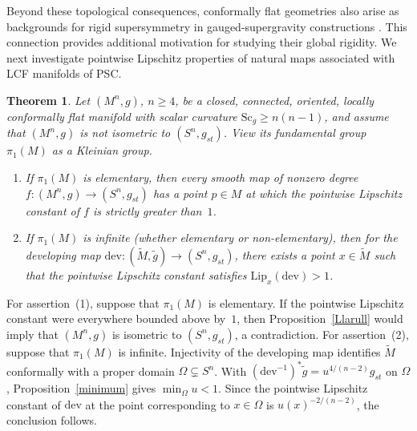 \documentclass[12pt,oneside,a4paper]{article}
\newtheorem{theoremC}{Theorem}
\theoremstyle{mytheorem}
\theoremstyle{remark}
\theoremstyle{definition}
\begin{document}
Beyond these topological consequences, conformally flat geometries also arise
as backgrounds for rigid supersymmetry in gauged-supergravity constructions
\cite{zbMATH06267307}. This connection
provides additional motivation for studying their global rigidity. We next
investigate pointwise Lipschitz properties of natural maps associated with LCF
manifolds of PSC.

\begin{theoremC}\label{Lipschitz}
Let $(M^{n}, g)$, $n \ge 4$, be a closed, connected, oriented, locally conformally flat manifold with scalar curvature
$\mathrm{Sc}_{g} \ge n(n-1)$, and assume that $(M^{n}, g)$ is not isometric to $(S^{n}, g_{st})$.
View its fundamental group $\pi_1(M)$ as a Kleinian group.
\begin{enumerate}
\item[(1)] If $\pi_1(M)$ is elementary, then every smooth map of
nonzero degree $f\colon(M^{n},g)\to (S^{n},g_{st})$ has a
point $p\in M$ at which the pointwise Lipschitz constant of $f$ is
strictly greater than~$1$.
\item[(2)] If $\pi_1(M)$ is infinite (whether elementary or non-elementary),
then for the developing map
$\mathrm{dev} \colon (\widetilde{M}, \tilde g) \to (S^{n}, g_{st})$,
there exists a point $x \in \widetilde{M}$ such that the pointwise Lipschitz constant satisfies
$\mathrm{Lip}_{x}(\mathrm{dev}) > 1$.
\end{enumerate}
\end{theoremC}

For assertion~\textup{(1)}, suppose that $\pi_1(M)$ is elementary. If the
pointwise Lipschitz constant were
everywhere bounded above by~$1$, then Proposition~\ref{Llarull} would imply
that $(M^{n}, g)$ is isometric to $(S^{n}, g_{st})$, a contradiction.
For assertion~\textup{(2)}, suppose that $\pi_1(M)$ is infinite. Injectivity
of the developing map identifies $\widetilde M$ conformally with a proper
domain $\Omega\subsetneq S^n$. With
$(\mathrm{dev}^{-1})^*\tilde g=u^{4/(n-2)}g_{st}$ on $\Omega$,
Proposition~\ref{minimum} gives $\min_\Omega u<1$. Since the pointwise
Lipschitz constant of $\mathrm{dev}$ at the point corresponding to
$x\in\Omega$ is $u(x)^{-2/(n-2)}$, the conclusion follows.
\end{document}
